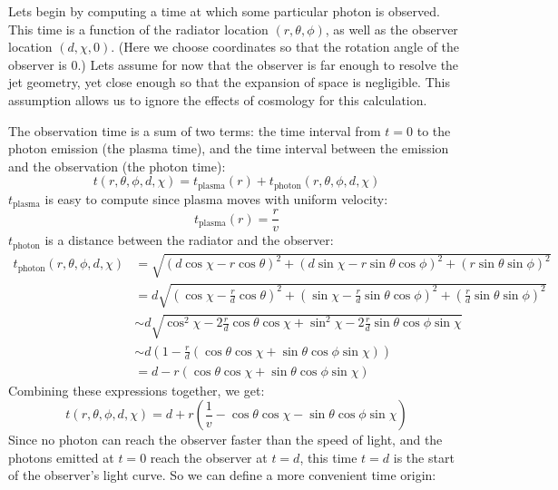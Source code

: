\documentclass{article}
\begin{document}
Lets begin by computing a time at which some particular photon is observed. This time is a function of the radiator location $\left(r, \theta, \phi\right)$, as well as the observer location $\left(d, \chi, 0\right)$. (Here we choose coordinates so that the rotation angle of the observer is $0$.) Lets assume for now that the observer is far enough to resolve the jet geometry, yet close enough so that the expansion of space is negligible. This assumption allows us to ignore the effects of cosmology for this calculation.

The observation time is a sum of two terms: the time interval from $t = 0$ to the photon emission (the plasma time), and the time interval between the emission and the observation (the photon time):
\begin{equation*}
t\left(r, \theta, \phi, d, \chi\right) = t_\text{plasma}\left(r\right) + t_\text{photon}\left(r, \theta, \phi, d, \chi\right)
\end{equation*}
$t_\text{plasma}$ is easy to compute since plasma moves with uniform velocity:
\begin{equation*}
t_\text{plasma}\left(r\right) = \frac{r}{v}
\end{equation*}
$t_\text{photon}$ is a distance between the radiator and the observer:
\begin{align*}
t_\text{photon}\left(r, \theta, \phi, d, \chi\right) &= \sqrt{
	\left( d \cos\chi - r \cos\theta \right)^2 +
	\left( d \sin\chi - r \sin\theta \cos\phi \right)^2 +
	\left( r \sin\theta \sin\phi \right)^2
} \\
&= d\sqrt{
	\left( \cos\chi - \frac{r}{d} \cos\theta \right)^2 +
	\left( \sin\chi - \frac{r}{d} \sin\theta \cos\phi \right)^2 +
	\left(\frac{r}{d} \sin\theta \sin\phi \right)^2
} \\
&\sim d\sqrt{
	\cos^2{\chi} - 2\frac{r}{d} \cos\theta \cos\chi + \sin^2\chi - 2\frac{r}{d} \sin\theta \cos\phi \sin\chi
} \\
&\sim d\left(
	1 - 
	\frac{r}{d} \left( \cos\theta \cos\chi + \sin\theta \cos\phi \sin\chi \right)
\right) \\
&= d - r\left( \cos\theta \cos\chi + \sin\theta \cos\phi \sin\chi \right)
\end{align*}
Combining these expressions together, we get:
\begin{equation*}
t\left(r, \theta, \phi, d, \chi\right) = d + r\left( \frac{1}{v} - \cos\theta \cos\chi - \sin\theta \cos\phi \sin\chi \right)
\end{equation*}
Since no photon can reach the observer faster than the speed of light, and the photons emitted at $t = 0$ reach the observer at $t = d$, this time $t = d$ is the start of the observer's light curve. So we can define a more convenient time origin:
\end{document}
